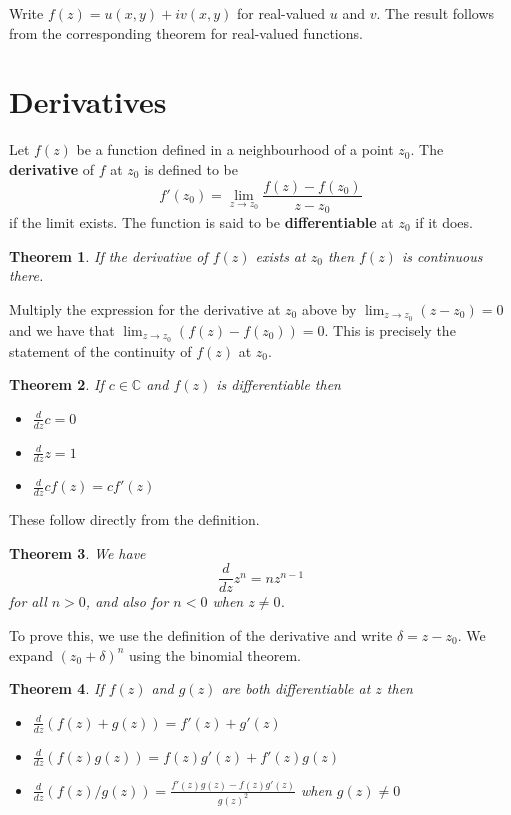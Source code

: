 \documentclass[a4paper,10pt]{article}
\newcommand{\C}{\mathbb{C}}
\newtheorem{theorem}{Theorem}[section]
\newenvironment{definition}[1][Definition]{\begin{trivlist}
\item[\hskip \labelsep {\bfseries #1}]}{\end{trivlist}}
\begin{document}
Write $f(z) = u(x, y) + iv(x, y)$ for real-valued $u$ and $v$. The result follows from the corresponding theorem for real-valued functions.

\section{Derivatives}

\begin{definition}
Let $f(z)$ be a function defined in a neighbourhood of a point $z_0$. The \textbf{derivative} of $f$ at $z_0$ is defined to be
$$f'(z_0) = \lim_{z\to z_0} \frac{f(z) - f(z_0)}{z - z_0}$$
if the limit exists. The function is said to be \textbf{differentiable} at $z_0$ if it does.
\end{definition}

\begin{theorem}
If the derivative of $f(z)$ exists at $z_0$ then $f(z)$ is continuous there.
\end{theorem}

Multiply the expression for the derivative at $z_0$ above by $\lim_{z\to z_0}(z - z_0) = 0$ and we have that $\lim_{z\to z_0}(f(z) - f(z_0)) = 0$. This is precisely the statement of the continuity of $f(z)$ at $z_0$.

\begin{theorem}
If $c \in \C$ and $f(z)$ is differentiable then
\begin{itemize}
\item $\frac{d}{dz}c = 0$
\item $\frac{d}{dz}z = 1$
\item $\frac{d}{dz}cf(z) = cf'(z)$
\end{itemize}
\end{theorem}

These follow directly from the definition.

\begin{theorem}
We have
$$\frac{d}{dz}z^n = nz^{n-1}$$
for all $n > 0$, and also for $n < 0$ when $z \neq 0$.
\end{theorem}

To prove this, we use the definition of the derivative and write $\delta = z - z_0$. We expand $(z_0 + \delta)^n$ using the binomial theorem.

\begin{theorem}
If $f(z)$ and $g(z)$ are both differentiable at $z$ then
\begin{itemize}
\item $\frac{d}{dz}\left(f(z) + g(z)\right) = f'(z) + g'(z)$
\item $\frac{d}{dz}\left(f(z)g(z)\right) = f(z)g'(z) + f'(z)g(z)$
\item $\frac{d}{dz}\left(f(z)/g(z)\right) = \frac{f'(z)g(z) - f(z)g'(z)}{g(z)^2}$ when $g(z) \neq 0$
\end{itemize}
\end{theorem}
\end{document}
